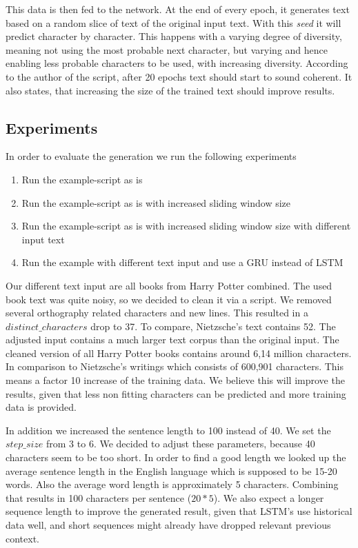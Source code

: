 \documentclass{article}[]
\begin{document}
This data is then fed to the network.
At the end of every epoch, it generates text based on a random slice of text of the original input text.
With this \emph{seed} it will predict character by character.
This happens with a varying degree of diversity, meaning not using the most probable next character, but varying and hence enabling less probable characters to be used, with increasing diversity.
According to the author of the script, after 20 epochs text should start to sound coherent.
It also states, that increasing the size of the trained text should improve results.

\subsection{Experiments}
In order to evaluate the generation we run the following experiments
\begin{enumerate}
\item{Run the example-script as is}
\item{Run the example-script as is with increased sliding window size}
\item{Run the example-script as is with increased sliding window size with different input text}
\item{Run the example with different text input and use a GRU instead of LSTM}
\end{enumerate}

Our different text input are all books from Harry Potter combined.
The used book text was quite noisy, so we decided to clean it via a script.
We removed several orthography related characters and new lines.
This resulted in a $distinct\_characters$ drop to 37.
To compare, Nietzsche's text contains 52.
The adjusted input contains a much larger text corpus than the original input.
The cleaned version of all Harry Potter books contains around 6,14 million characters.
In comparison to Nietzsche's writings which consists of 600,901 characters.
This means a factor 10 increase of the training data.
We believe this will improve the results, given that less non fitting characters can be predicted and more training data is provided.

In addition we increased the sentence length to 100 instead of 40.
We set the $step\_size$ from 3 to 6.
We decided to adjust these parameters, because 40 characters seem to be too short.
In order to find a good length we looked up the average sentence length in the English language which is supposed to be 15-20 words\cite{cutts2013oxford}.
Also the average word length is approximately 5 characters\cite{shannon1951prediction}.
Combining that results in 100 characters per sentence ($20 * 5$).
We also expect a longer sequence length to improve the generated result, given that LSTM's use historical data well, and short sequences might already have dropped relevant previous context\cite{sundermeyer2013comparison}.
\end{document}
